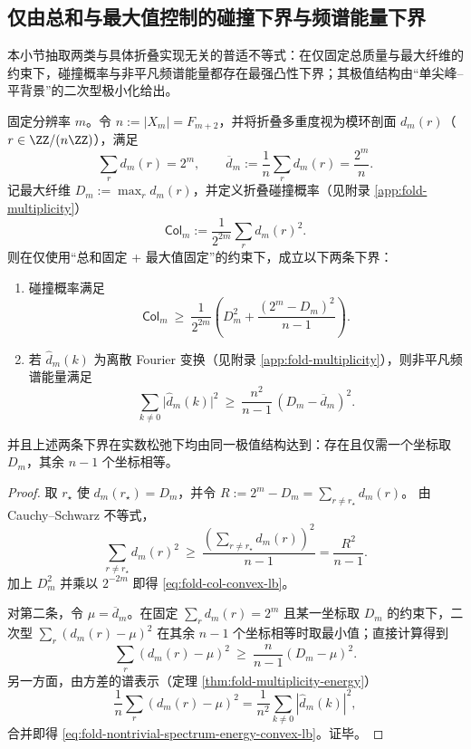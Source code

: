 \subsection{仅由总和与最大值控制的碰撞下界与频谱能量下界}\label{subsec:fold-collision-convex-lower-bounds}
本小节抽取两类与具体折叠实现无关的普适不等式：在仅固定总质量与最大纤维的约束下，碰撞概率与非平凡频谱能量都存在最强凸性下界；其极值结构由“单尖峰--平背景”的二次型极小化给出。

\begin{theorem}[给定最大纤维下的最强凸性下界]\label{thm:fold-collision-convex-lower-bounds}
固定分辨率 \(m\)。令 \(n:=|X_m|=F_{m+2}\)，并将折叠多重度视为模环剖面 \(d_m(r)\)（\(r\in\ZZ/(n\ZZ)\)），满足
\[
\sum_{r} d_m(r)=2^m,\qquad
\overline d_m:=\frac{1}{n}\sum_r d_m(r)=\frac{2^m}{n}.
\]
记最大纤维
\(
D_m:=\max_r d_m(r)
\)，并定义折叠碰撞概率（见附录 \ref{app:fold-multiplicity}）
\[
\mathsf{Col}_m:=\frac{1}{2^{2m}}\sum_r d_m(r)^2.
\]
则在仅使用“总和固定 + 最大值固定”的约束下，成立以下两条下界：
\begin{enumerate}
\item 碰撞概率满足
\begin{equation}\label{eq:fold-col-convex-lb}
\boxed{\;
\mathsf{Col}_m\ \ge\ \frac{1}{2^{2m}}\left(D_m^2+\frac{(2^m-D_m)^2}{n-1}\right).\;}
\end{equation}
\item 若 \(\widehat d_m(k)\) 为离散 Fourier 变换（见附录 \ref{app:fold-multiplicity}），则非平凡频谱能量满足
\begin{equation}\label{eq:fold-nontrivial-spectrum-energy-convex-lb}
\boxed{\;
\sum_{k\ne 0}\bigl|\widehat d_m(k)\bigr|^2\ \ge\ \frac{n^2}{n-1}\,(D_m-\overline d_m)^2.\;}
\end{equation}
\end{enumerate}
并且上述两条下界在实数松弛下均由同一极值结构达到：存在且仅需一个坐标取 \(D_m\)，其余 \(n-1\) 个坐标相等。
\end{theorem}
\begin{proof}
取 \(r_\star\) 使 \(d_m(r_\star)=D_m\)，并令 \(R:=2^m-D_m=\sum_{r\ne r_\star}d_m(r)\)。
由 Cauchy--Schwarz 不等式，
\[
\sum_{r\ne r_\star} d_m(r)^2\ \ge\ \frac{\left(\sum_{r\ne r_\star}d_m(r)\right)^2}{n-1}
=\frac{R^2}{n-1}.
\]
加上 \(D_m^2\) 并乘以 \(2^{-2m}\) 即得 \eqref{eq:fold-col-convex-lb}。

对第二条，令 \(\mu=\overline d_m\)。在固定 \(\sum_r d_m(r)=2^m\) 且某一坐标取 \(D_m\) 的约束下，二次型
\(
\sum_r(d_m(r)-\mu)^2
\)
在其余 \(n-1\) 个坐标相等时取最小值；直接计算得到
\[
\sum_r(d_m(r)-\mu)^2\ \ge\ \frac{n}{n-1}(D_m-\mu)^2.
\]
另一方面，由方差的谱表示（定理 \ref{thm:fold-multiplicity-energy}）
\[
\frac{1}{n}\sum_r(d_m(r)-\mu)^2=\frac{1}{n^2}\sum_{k\ne 0}|\widehat d_m(k)|^2,
\]
合并即得 \eqref{eq:fold-nontrivial-spectrum-energy-convex-lb}。证毕。
\end{proof}

